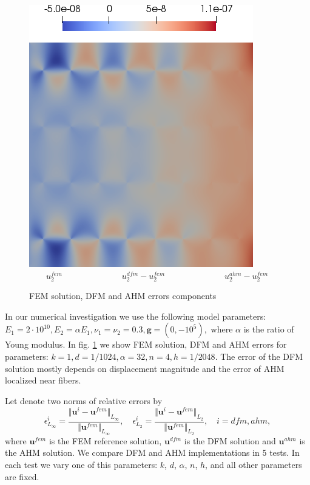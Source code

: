 \documentclass[a4paper]{jpconf}
\begin{document}
\begin{figure}[H]
    \includegraphics[width=0.2\linewidth]{data/eay.png}\\
    $\hspace{2em} u_2^{fem} \hspace{7em} u_2^{dfm}-u_2^{fem} \hspace{7em} u_2^{ahm}-u_2^{fem}$ \\
    \caption{FEM solution, DFM and AHM errors components}
    \label{fig:solution}
\end{figure}

In our numerical investigation we use the following model parameters:
$E_1 = 2\cdot10^{10}, E_2 = \alpha E_1, \nu_1 = \nu_2 = 0.3, \bm{g} = (0, -10^5),$
where $\alpha$ is the ratio of Young modulus. 
In fig. \ref{fig:solution} we show FEM solution, DFM and AHM errors for parameters: $k = 1, d = 1/1024, \alpha = 32, n = 4, h = 1/2048$.
The error of the DFM solution mostly depends on displacement magnitude and the error of AHM localized near fibers.

Let denote two norms of relative errors by
\[
    \epsilon^{i}_{L_\infty} = \frac{\Vert \bm{u}^{i} - \bm{u}^{fem} \Vert_{L_\infty}}{\Vert \bm{u}^{fem} \Vert_{L_\infty}}, \quad
    \epsilon^{i}_{L_2} = \frac{\Vert \bm{u}^{i} - \bm{u}^{fem} \Vert_{L_2}}{\Vert \bm{u}^{fem} \Vert_{L_2}}, \quad
    i = dfm, ahm, 
\]
where $\bm{u}^{fem}$ is the FEM reference solution, $\bm{u}^{dfm}$ is the DFM solution and $\bm{u}^{ahm}$ is the AHM solution.
We compare DFM and AHM implementations in 5 tests. In each test we vary one of this parameters: $k$, $d$, $\alpha$, $n$, $h$, and all other parameters are fixed.
\end{document}
